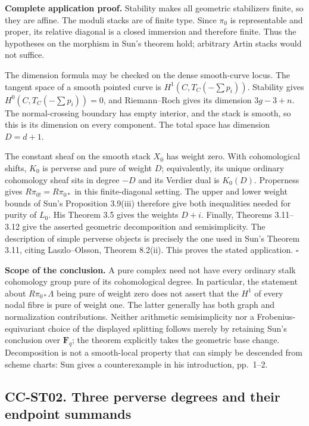 \documentclass[11pt,a4paper]{article}
\theoremstyle{definition}\newtheorem{definition}[theorem]{Definition}
\theoremstyle{remark}\newtheorem{remark}[theorem]{Remark}
\begin{document}
\textbf{Complete application proof.} Stability makes all geometric
stabilizers finite, so they are affine. The moduli stacks are of finite
type. Since \(\pi_0\) is representable and proper, its relative diagonal
is a closed immersion and therefore finite. Thus the hypotheses on the
morphism in Sun's theorem hold; arbitrary Artin stacks would not
suffice.

The dimension formula may be checked on the dense smooth-curve locus.
The tangent space of a smooth pointed curve is
\(H^1(C,T_C(-\sum p_i))\). Stability gives \(H^0(C,T_C(-\sum p_i))=0\),
and Riemann--Roch gives its dimension \(3g-3+n\). The normal-crossing
boundary has empty interior, and the stack is smooth, so this is its
dimension on every component. The total space has dimension \(D=d+1\).

The constant sheaf on the smooth stack \(X_0\) has weight zero. With
cohomological shifts, \(K_0\) is perverse and pure of weight \(D\);
equivalently, its unique ordinary cohomology sheaf sits in degree \(-D\)
and its Verdier dual is \(K_0(D)\). Properness gives
\(R\pi_{0!}=R\pi_{0*}\) in this finite-diagonal setting. The upper and
lower weight bounds of Sun's Proposition 3.9(iii) therefore give both
inequalities needed for purity of \(L_0\). His Theorem 3.5 gives the
weights \(D+i\). Finally, Theorems 3.11--3.12 give the asserted
geometric decomposition and semisimplicity. The description of simple
perverse objects is precisely the one used in Sun's Theorem 3.11, citing
Laszlo--Olsson, Theorem 8.2(ii). This proves the stated application.
\(\square\)

\textbf{Scope of the conclusion.} A pure complex need not have every
ordinary stalk cohomology group pure of its cohomological degree. In
particular, the statement about \(R\pi_{0*}\Lambda\) being pure of
weight zero does not assert that the \(H^1\) of every nodal fibre is
pure of weight one. The latter generally has both graph and
normalization contributions. Neither arithmetic semisimplicity nor a
Frobenius-equivariant choice of the displayed splitting follows merely
by retaining Sun's conclusion over \(\mathbf F_q\); the theorem
explicitly takes the geometric base change. Decomposition is not a
smooth-local property that can simply be descended from scheme charts:
Sun gives a counterexample in his introduction, pp.~1--2.

\subsection{CC-ST02. Three perverse degrees and their endpoint
summands}\label{cc-st02.-three-perverse-degrees-and-their-endpoint-summands}
\end{document}
